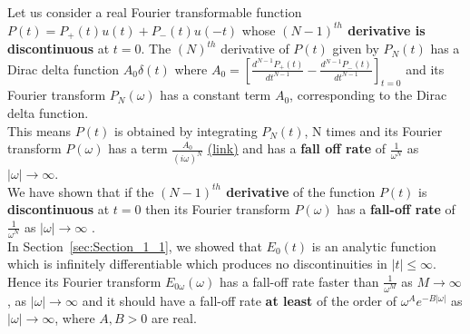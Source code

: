 \documentclass[11pt]{elsarticle}
\begin{document}
Let us consider a real Fourier transformable function $P(t)=P_{+}(t) u(t) + P_{-}(t)u(-t)$ whose \textbf{$(N-1)^{th}$ derivative is discontinuous} at $t=0$. The $(N)^{th}$ derivative of $P(t)$ given by $P_N(t)$ has a Dirac delta function $A_0 \delta(t)$ where $A_0 = [\frac{d^{N-1}P_{+}(t)}{dt^{N-1}} - \frac{d^{N-1}P_{-}(t)}{dt^{N-1}} ]_{t=0}$ and its Fourier transform $P_N(\omega)$ has a constant term $A_0$, corresponding to the Dirac delta function.\\

This means $P(t)$ is obtained by integrating $P_N(t)$, N times and its Fourier transform $P(\omega)$ has a term $ \frac{A_0}{(i \omega)^N}$ \href{https://web.stanford.edu/class/ee102/lectures/fourtran#page=15}{(link)} and has a \textbf{fall off rate} of $\frac{1}{\omega^N}$ as $|\omega| \to \infty$.\\%

We have shown that if the \textbf{$(N-1)^{th}$ derivative} of the function $P(t)$ is \textbf{discontinuous} at $t=0$ then its Fourier transform $P(\omega)$ has a \textbf{fall-off rate} of $\frac{1}{\omega^N}$ as $|\omega| \to \infty$ . \\

In Section~\ref{sec:Section_1_1}, we showed that $E_0(t)$ is an analytic function which is infinitely differentiable which produces no discontinuities in $|t| \leq \infty$. Hence its Fourier transform $E_{0\omega}(\omega)$ has a fall-off rate faster than $\frac{1}{\omega^M}$ as $M \to \infty$, as $|\omega| \to \infty$ and it should have a fall-off rate \textbf{at least }of the order of $\omega^A e^{-B|\omega|}$ as $|\omega| \to \infty$, where $A, B>0$ are  real. 


\end{document}
